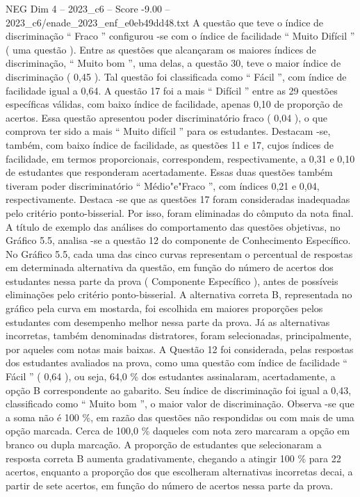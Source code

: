 \begin{textsample}{NEG Dim 4 – 2023\_c6 – Score -9.00 – 2023\_c6/enade\_2023\_enf\_e0eb49dd48.txt}
A questão que teve o índice de discriminação “ Fraco ” configurou -se com o índice de facilidade “ Muito Difícil ” ( uma questão ).
Entre as questões que alcançaram os maiores índices de discriminação, “ Muito bom ”, uma delas, a questão 30, teve o maior índice de discriminação ( 0,45 ).
Tal questão foi classificada como “ Fácil ”, com índice de facilidade igual a 0,64.
A questão 17 foi a mais “ Difícil ” entre as 29 questões específicas válidas, com baixo índice de facilidade, apenas 0,10 de proporção de acertos.
Essa questão apresentou poder discriminatório fraco ( 0,04 ), o que comprova ter sido a mais “ Muito difícil ” para os estudantes.
Destacam -se, também, com baixo índice de facilidade, as questões 11 e 17, cujos índices de facilidade, em termos proporcionais, correspondem, respectivamente, a 0,31 e 0,10 de estudantes que responderam acertadamente.
Essas duas questões também tiveram poder discriminatório “ Médio"e"Fraco ”, com índices 0,21 e 0,04, respectivamente.
Destaca -se que as questões 17 foram consideradas inadequadas pelo critério ponto-bisserial.
Por isso, foram eliminadas do cômputo da nota final.
A título de exemplo das análises do comportamento das questões objetivas, no Gráfico 5.5, analisa -se a questão 12 do componente de Conhecimento Específico.
No Gráfico 5.5, cada uma das cinco curvas representam o percentual de respostas em determinada alternativa da questão, em função do número de acertos dos estudantes nessa parte da prova ( Componente Específico ), antes de possíveis eliminações pelo critério ponto-bisserial.
A alternativa correta B, representada no gráfico pela curva em mostarda, foi escolhida em maiores proporções pelos estudantes com desempenho melhor nessa parte da prova.
Já as alternativas incorretas, também denominadas distratores, foram selecionadas, principalmente, por aqueles com notas mais baixas.
A Questão 12 foi considerada, pelas respostas dos estudantes avaliados na prova, como uma questão com índice de facilidade “ Fácil ” ( 0,64 ), ou seja, 64,0 \% dos estudantes assinalaram, acertadamente, a opção B correspondente ao gabarito.
Seu índice de discriminação foi igual a 0,43, classificado como “ Muito bom ”, o maior valor de discriminação.
Observa -se que a soma não é 100 \%, em razão das questões não respondidas ou com mais de uma opção marcada.
Cerca de 100,0 \% daqueles com nota zero marcaram a opção em branco ou dupla marcação.
A proporção de estudantes que selecionaram a resposta correta B aumenta gradativamente, chegando a atingir 100 \% para 22 acertos, enquanto a proporção dos que escolheram alternativas incorretas decai, a partir de sete acertos, em função do número de acertos nessa parte da prova.

\end{textsample}

